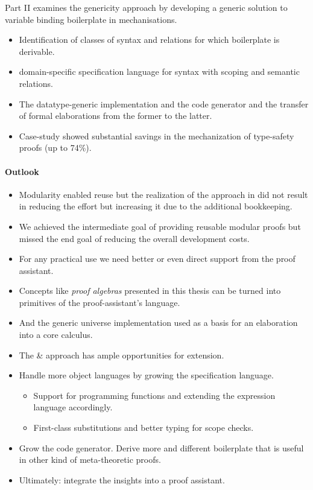 Part II examines the genericity approach by developing a generic solution
to variable binding boilerplate in mechanisations.

\begin{itemize}
\item Identification of classes of syntax and relations for which
  boilerplate is derivable.
\item \Knot domain-specific specification language for syntax with scoping
  and semantic relations.
\item The datatype-generic \Loom implementation and the \Needle code generator
  and the transfer of formal elaborations from the former to the latter.
\item Case-study showed substantial savings in the mechanization of type-safety
  proofs (up to 74\%).
\end{itemize}


\paragraph{Outlook}

\begin{itemize}
\item Modularity enabled reuse but the realization of the approach in \Coq
  did not result in reducing the effort but increasing it due to the
  additional bookkeeping.
\item We achieved the intermediate goal of providing reusable modular proofs
  but missed the end goal of reducing the overall development costs.
\item For any practical use we need better or even direct support from the
  proof assistant.
\item Concepts like \emph{proof algebras} presented in this thesis can
  be turned into primitives of the proof-assistant's language.
\item And the generic universe implementation used as a basis for an
  elaboration into a core calculus.
\end{itemize}

\begin{itemize}
\item The \Needle \& \Knot approach has ample opportunities for extension.
\item Handle more object languages by growing the specification language.
  \begin{itemize}
  \item Support for programming functions and extending the expression language
    accordingly.
  \item First-class substitutions and better typing for scope checks.
  \end{itemize}
\item Grow the code generator. Derive more and different boilerplate that is
  useful in other kind of meta-theoretic proofs.
\item Ultimately: integrate the insights into a proof assistant.
\end{itemize}

